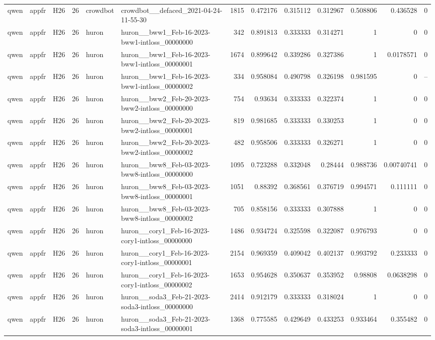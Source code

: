 \begin{longtable}{lllrllrrrrrrr}
qwen & appfr & H26 & 26 & crowdbot & crowdbot\_\_defaced\_2021-04-24-11-55-30 & 1815 & 0.472176 & 0.315112 & 0.312967 & 0.508806 & 0.436528 & 0 \\
qwen & appfr & H26 & 26 & huron & huron\_\_bww1\_Feb-16-2023-bww1-intloss\_00000000 & 342 & 0.891813 & 0.333333 & 0.314271 & 1 & 0 & 0 \\
qwen & appfr & H26 & 26 & huron & huron\_\_bww1\_Feb-16-2023-bww1-intloss\_00000001 & 1674 & 0.899642 & 0.339286 & 0.327386 & 1 & 0.0178571 & 0 \\
qwen & appfr & H26 & 26 & huron & huron\_\_bww1\_Feb-16-2023-bww1-intloss\_00000002 & 334 & 0.958084 & 0.490798 & 0.326198 & 0.981595 & 0 & -- \\
qwen & appfr & H26 & 26 & huron & huron\_\_bww2\_Feb-20-2023-bww2-intloss\_00000000 & 754 & 0.93634 & 0.333333 & 0.322374 & 1 & 0 & 0 \\
qwen & appfr & H26 & 26 & huron & huron\_\_bww2\_Feb-20-2023-bww2-intloss\_00000001 & 819 & 0.981685 & 0.333333 & 0.330253 & 1 & 0 & 0 \\
qwen & appfr & H26 & 26 & huron & huron\_\_bww2\_Feb-20-2023-bww2-intloss\_00000002 & 482 & 0.958506 & 0.333333 & 0.326271 & 1 & 0 & 0 \\
qwen & appfr & H26 & 26 & huron & huron\_\_bww8\_Feb-03-2023-bww8-intloss\_00000000 & 1095 & 0.723288 & 0.332048 & 0.28444 & 0.988736 & 0.00740741 & 0 \\
qwen & appfr & H26 & 26 & huron & huron\_\_bww8\_Feb-03-2023-bww8-intloss\_00000001 & 1051 & 0.88392 & 0.368561 & 0.376719 & 0.994571 & 0.111111 & 0 \\
qwen & appfr & H26 & 26 & huron & huron\_\_bww8\_Feb-03-2023-bww8-intloss\_00000002 & 705 & 0.858156 & 0.333333 & 0.307888 & 1 & 0 & 0 \\
qwen & appfr & H26 & 26 & huron & huron\_\_cory1\_Feb-16-2023-cory1-intloss\_00000000 & 1486 & 0.934724 & 0.325598 & 0.322087 & 0.976793 & 0 & 0 \\
qwen & appfr & H26 & 26 & huron & huron\_\_cory1\_Feb-16-2023-cory1-intloss\_00000001 & 2154 & 0.969359 & 0.409042 & 0.402137 & 0.993792 & 0.233333 & 0 \\
qwen & appfr & H26 & 26 & huron & huron\_\_cory1\_Feb-16-2023-cory1-intloss\_00000002 & 1653 & 0.954628 & 0.350637 & 0.353952 & 0.98808 & 0.0638298 & 0 \\
qwen & appfr & H26 & 26 & huron & huron\_\_soda3\_Feb-21-2023-soda3-intloss\_00000000 & 2414 & 0.912179 & 0.333333 & 0.318024 & 1 & 0 & 0 \\
qwen & appfr & H26 & 26 & huron & huron\_\_soda3\_Feb-21-2023-soda3-intloss\_00000001 & 1368 & 0.775585 & 0.429649 & 0.433253 & 0.933464 & 0.355482 & 0 \\

\end{longtable}
